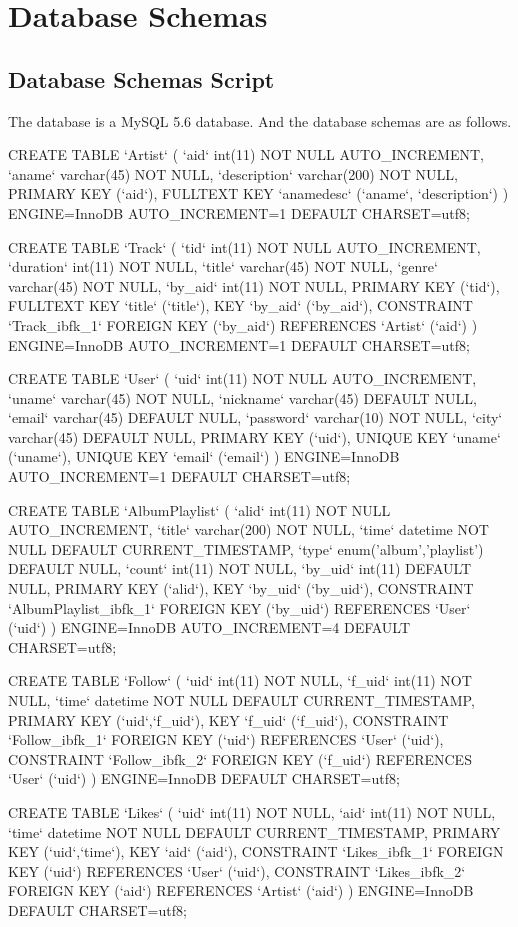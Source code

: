 \documentclass[letterpaper, 12pt]{report}
\begin{document}
	\section{Database Schemas}
	\subsection{Database Schemas Script}
	The database is a MySQL 5.6 database. And the database schemas are as follows.
	\begin{spverbatim}
	CREATE TABLE `Artist` (
	`aid` int(11) NOT NULL AUTO_INCREMENT,
	`aname` varchar(45) NOT NULL,
	`description` varchar(200) NOT NULL,
	PRIMARY KEY (`aid`),
	FULLTEXT KEY `anamedesc` (`aname`, `description`)
	) ENGINE=InnoDB AUTO_INCREMENT=1 DEFAULT CHARSET=utf8;
	
	CREATE TABLE `Track` (
	`tid` int(11) NOT NULL AUTO_INCREMENT,
	`duration` int(11) NOT NULL,
	`title` varchar(45) NOT NULL,
	`genre` varchar(45) NOT NULL,
	`by_aid` int(11) NOT NULL,
	PRIMARY KEY (`tid`),
	FULLTEXT KEY `title` (`title`),
	KEY `by_aid` (`by_aid`),
	CONSTRAINT `Track_ibfk_1` FOREIGN KEY (`by_aid`) REFERENCES `Artist` (`aid`)
	) ENGINE=InnoDB AUTO_INCREMENT=1 DEFAULT CHARSET=utf8;
	
	CREATE TABLE `User` (
	`uid` int(11) NOT NULL AUTO_INCREMENT,
	`uname` varchar(45) NOT NULL,
	`nickname` varchar(45) DEFAULT NULL,
	`email` varchar(45) DEFAULT NULL,
	`password` varchar(10) NOT NULL,
	`city` varchar(45) DEFAULT NULL,
	PRIMARY KEY (`uid`),
	UNIQUE KEY `uname` (`uname`),
	UNIQUE KEY `email` (`email`)
	) ENGINE=InnoDB AUTO_INCREMENT=1 DEFAULT CHARSET=utf8;
	
	CREATE TABLE `AlbumPlaylist` (
	`alid` int(11) NOT NULL AUTO_INCREMENT,
	`title` varchar(200) NOT NULL,
	`time` datetime NOT NULL DEFAULT CURRENT_TIMESTAMP,
	`type` enum('album','playlist') DEFAULT NULL,
	`count` int(11) NOT NULL,
	`by_uid` int(11) DEFAULT NULL,
	PRIMARY KEY (`alid`),
	KEY `by_uid` (`by_uid`),
	CONSTRAINT `AlbumPlaylist_ibfk_1` FOREIGN KEY (`by_uid`) REFERENCES `User` (`uid`)
	) ENGINE=InnoDB AUTO_INCREMENT=4 DEFAULT CHARSET=utf8;
	
	CREATE TABLE `Follow` (
	`uid` int(11) NOT NULL,
	`f_uid` int(11) NOT NULL,
	`time` datetime NOT NULL DEFAULT CURRENT_TIMESTAMP,
	PRIMARY KEY (`uid`,`f_uid`),
	KEY `f_uid` (`f_uid`),
	CONSTRAINT `Follow_ibfk_1` FOREIGN KEY (`uid`) REFERENCES `User` (`uid`),
	CONSTRAINT `Follow_ibfk_2` FOREIGN KEY (`f_uid`) REFERENCES `User` (`uid`)
	) ENGINE=InnoDB DEFAULT CHARSET=utf8;
	
	CREATE TABLE `Likes` (
	`uid` int(11) NOT NULL,
	`aid` int(11) NOT NULL,
	`time` datetime NOT NULL DEFAULT CURRENT_TIMESTAMP,
	PRIMARY KEY (`uid`,`time`),
	KEY `aid` (`aid`),
	CONSTRAINT `Likes_ibfk_1` FOREIGN KEY (`uid`) REFERENCES `User` (`uid`),
	CONSTRAINT `Likes_ibfk_2` FOREIGN KEY (`aid`) REFERENCES `Artist` (`aid`)
	) ENGINE=InnoDB DEFAULT CHARSET=utf8;
	

\end{spverbatim}
\end{document}
